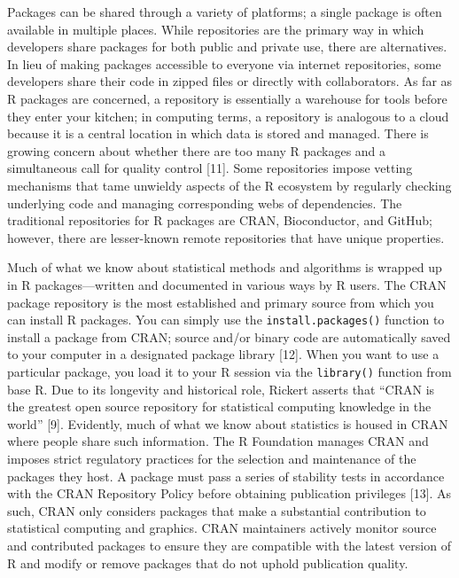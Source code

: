 \documentclass[10pt,letterpaper]{article}
\begin{document}
Packages can be shared through a variety of platforms; a single package
is often available in multiple places. While repositories are the
primary way in which developers share packages for both public and
private use, there are alternatives. In lieu of making packages
accessible to everyone via internet repositories, some developers share
their code in zipped files or directly with collaborators. As far as R
packages are concerned, a repository is essentially a warehouse for
tools before they enter your kitchen; in computing terms, a repository
is analogous to a cloud because it is a central location in which data
is stored and managed. There is growing concern about whether there are
too many R packages and a simultaneous call for quality control
{[}11{]}. Some repositories impose vetting mechanisms that tame unwieldy
aspects of the R ecosystem by regularly checking underlying code and
managing corresponding webs of dependencies. The traditional
repositories for R packages are CRAN, Bioconductor, and GitHub; however,
there are lesser-known remote repositories that have unique properties.

Much of what we know about statistical methods and algorithms is wrapped
up in R packages---written and documented in various ways by R users.
The CRAN package repository is the most established and primary source
from which you can install R packages. You can simply use the
\texttt{install.packages()} function to install a package from CRAN;
source and/or binary code are automatically saved to your computer in a
designated package library {[}12{]}. When you want to use a particular
package, you load it to your R session via the \texttt{library()}
function from base R. Due to its longevity and historical role, Rickert
asserts that ``CRAN is the greatest open source repository for
statistical computing knowledge in the world'' {[}9{]}. Evidently, much
of what we know about statistics is housed in CRAN where people share
such information. The R Foundation manages CRAN and imposes strict
regulatory practices for the selection and maintenance of the packages
they host. A package must pass a series of stability tests in accordance
with the CRAN Repository Policy before obtaining publication privileges
{[}13{]}. As such, CRAN only considers packages that make a substantial
contribution to statistical computing and graphics. CRAN maintainers
actively monitor source and contributed packages to ensure they are
compatible with the latest version of R and modify or remove packages
that do not uphold publication quality.
\end{document}
